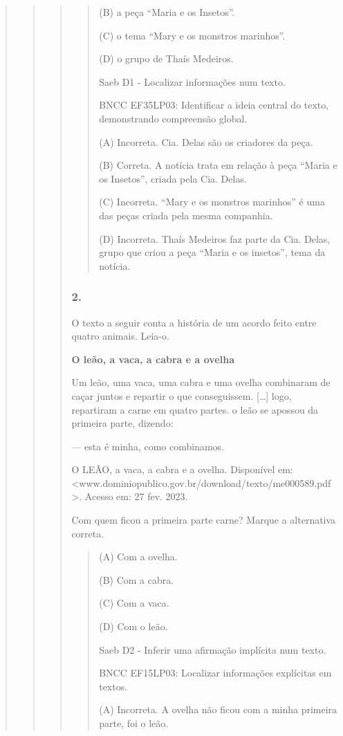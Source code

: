 \begin{quote}
\begin{quote}
\begin{quote}
\begin{quote}
(B) a peça ``Maria e os Insetos''.

(C) o tema ``Mary e os monstros marinhos''.

(D) o grupo de Thaís Medeiros.

Saeb D1 - Localizar informações num texto.

BNCC EF35LP03: Identificar a ideia central do texto, demonstrando
compreensão global.

(A) Incorreta. Cia. Delas são os criadores da peça.

(B) Correta. A notícia trata em relação à peça ``Maria e os Insetos'',
criada pela Cia. Delas.

(C) Incorreta. ``Mary e os monstros marinhos'' é uma das peças criada
pela mesma companhia.

(D) Incorreta. Thaís Medeiros faz parte da Cia. Delas, grupo que criou a
peça ``Maria e os insetos'', tema da notícia.
\end{quote}

\subsubsection{2. }\label{section-81}

O texto a seguir conta a história de um acordo feito entre quatro
animais. Leia-o.

\textbf{O leão, a vaca, a cabra e a ovelha}

Um leão, uma vaca, uma cabra e uma ovelha combinaram de caçar juntos e
repartir o que conseguissem. {[}\ldots{}{]} logo, repartiram a carne em
quatro partes. o leão se apossou da primeira parte, dizendo:

--- esta é minha, como combinamos.

O LEÃO, a vaca, a cabra e a ovelha. Disponível em:
\textless{}www.dominiopublico.gov.br/download/texto/me000589.pdf\textgreater{}.
Acesso em: 27 fev. 2023.

Com quem ficou a primeira parte carne? Marque a alternativa correta.

\begin{quote}
(A) Com a ovelha.

(B) Com a cabra.

(C) Com a vaca.

(D) Com o leão.

Saeb D2 - Inferir uma afirmação implícita num texto.

BNCC EF15LP03: Localizar informações explícitas em textos.

(A) Incorreta. A ovelha não ficou com a minha primeira parte, foi o
leão.


\end{quote}
\end{quote}
\end{quote}
\end{quote}
